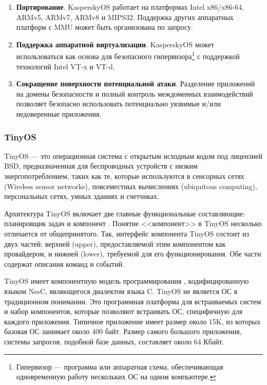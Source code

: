 \begin{enumerate}[label*=\arabic*.]
	\item \textbf{Портирование}. \newline
	KasperskyOS работает на платформах Intel x86/x86-64, ARMv5, ARMv7, ARMv8 и MIPS32. Поддержка других аппаратных платформ с MMU может быть организована по запросу.
	
	\item \textbf{Поддержка аппаратной виртуализации}. \newline
	KasperskyOS может использоваться как основа для безопасного гипервизора\footnote{Гипервизор --- программа или аппаратная схема, обеспечивающая одновременную работу нескольких ОС на одном компьютере.} с поддержкой технологий Intel VT-x и VT-d.
	
	\item \textbf{Сокращение поверхности потенциальной атаки}. \newline
	Разделение приложений на домены безопасности и полный контроль междоменных взаимодействий позволяет безопасно использовать потенциально уязвимые и/или недоверенные приложения.
\end{enumerate}



\subsubsection{TinyOS}

TinyOS \cite{TinyOS_main} --- это операционная система с открытым исходным кодом под лицензией BSD, предназначенная для беспроводных устройств с низким энергопотреблением, таких как те, которые используются в сенсорных сетях (Wireless sensor networks), повсеместных вычислениях (ubiquitous computing), персональных сетях, умных зданиях и счетчиках.


Архитектура TinyOS включает две главные функциональные составляющие: планировщик задач и компонент \cite{TinyOS_BMSTU}. Понятие <<компонент>> в TinyOS несколько отличается от общепринятого. Так, интерфейс компонента TinyOS состоит из двух частей: верхней (upper), предоставляемой этим компонентом как провайдером, и нижней (lower), требуемой для его функционирования. Обе части содержат описания команд и событий.

TinyOS имеет компонентную модель программирования \cite{TinyOS_book}, кодифицированную языком NesC, являющегося диалектом языка C. TinyOS не является ОС в традиционном понимании. Это программная платформа для встраиваемых систем и набор компонентов, которые позволяют встраивать ОС, специфичную для каждого приложения. Типичное приложение имеет размер около 15K, из которых базовая ОС занимает около 400 байт. Размер самого большого приложения, системы запросов, подобной базе данных, составляет около 64 Кбайт.

